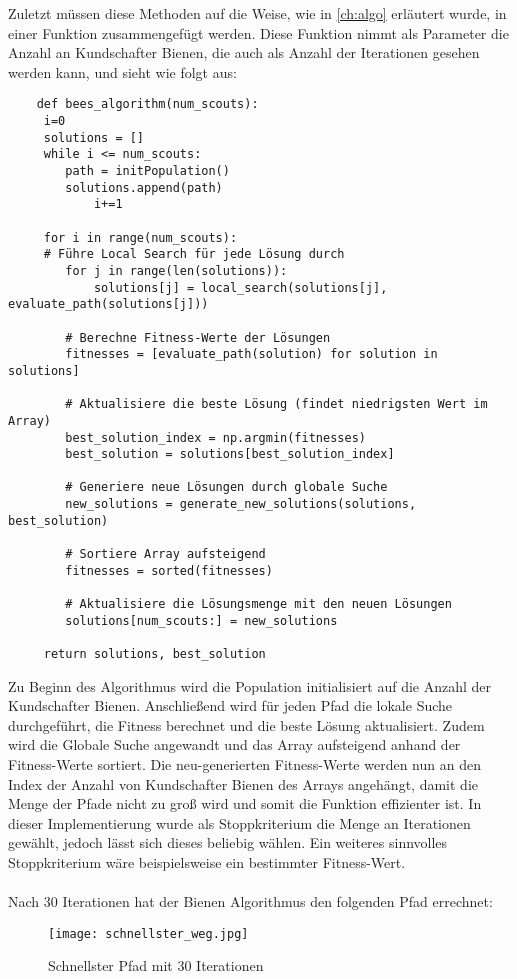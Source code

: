 Zuletzt müssen diese Methoden auf die Weise, wie in \autoref{ch:algo} erläutert wurde, in einer Funktion zusammengefügt werden. Diese Funktion nimmt als Parameter die Anzahl an Kundschafter Bienen, die auch als Anzahl der Iterationen gesehen werden kann, und sieht wie folgt aus:

\begin{verbatim}
    def bees_algorithm(num_scouts):
     i=0
     solutions = []
     while i <= num_scouts:    
        path = initPopulation()
        solutions.append(path)
            i+=1
    
     for i in range(num_scouts):
     # Führe Local Search für jede Lösung durch
        for j in range(len(solutions)):
            solutions[j] = local_search(solutions[j], evaluate_path(solutions[j]))
    
        # Berechne Fitness-Werte der Lösungen
        fitnesses = [evaluate_path(solution) for solution in solutions]
    
        # Aktualisiere die beste Lösung (findet niedrigsten Wert im Array)
        best_solution_index = np.argmin(fitnesses)
        best_solution = solutions[best_solution_index]
    
        # Generiere neue Lösungen durch globale Suche
        new_solutions = generate_new_solutions(solutions, best_solution)
    
        # Sortiere Array aufsteigend
        fitnesses = sorted(fitnesses)
    
        # Aktualisiere die Lösungsmenge mit den neuen Lösungen
        solutions[num_scouts:] = new_solutions
    
     return solutions, best_solution
\end{verbatim}
\vspace*{-3mm}
\vspace*{3mm}

Zu Beginn des Algorithmus wird die Population initialisiert auf die Anzahl der Kundschafter Bienen. Anschließend wird für jeden Pfad die lokale Suche durchgeführt, die Fitness berechnet und die beste Lösung aktualisiert. Zudem wird die Globale Suche angewandt und das Array aufsteigend anhand der Fitness-Werte sortiert. Die neu-generierten Fitness-Werte werden nun an den Index der Anzahl von Kundschafter Bienen des Arrays angehängt, damit die Menge der Pfade nicht zu groß wird und somit die Funktion effizienter ist.  
In dieser Implementierung wurde als Stoppkriterium die Menge an Iterationen gewählt, jedoch lässt sich dieses beliebig wählen. Ein weiteres sinnvolles Stoppkriterium wäre beispielsweise ein bestimmter Fitness-Wert. \\\\
Nach 30 Iterationen hat der Bienen Algorithmus den folgenden Pfad errechnet:
\begin{figure}[H]
    \centering
    \texttt{[image: schnellster\_weg.jpg]}
    \caption{Schnellster Pfad mit 30 Iterationen\\}   
    \label{fig:schnellster}
\end{figure}

